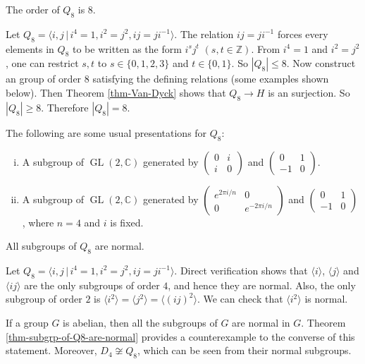 \begin{proposition}
	The order of $Q_8$ is $8$.
\end{proposition}
\begin{sketch}
	Let $Q_8 = \langle i,j\,|\, i^4=1, i^2=j^2, ij = ji^{-1}  \rangle$. The relation $ij = ji^{-1}$ forces every elements in $Q_8$ to be written as the form $i^sj^t$ $(s,t\in\mathbb{Z})$. From   $i^4=1$ and  $i^2=j^2$, one can restrict $s,t$ to  $s \in\{0,1,2,3\}$ and $t\in \{0,1\}$. So $|Q_8|\leq 8$.  Now construct an group of order $8$ satisfying the defining relations (some examples shown below). Then Theorem \ref{thm-Van-Dyck} shows that $Q_8 \to H$ is an surjection. So $|Q_8|\geq 8$.  Therefore $|Q_8|=8$.
\end{sketch}
The following are some usual presentations for $Q_8$: 
\begin{enumerate}[(i)]
	\item A subgroup of $\operatorname{GL}(2,\mathbb{C})$ generated by $\begin{pmatrix}
		0 & i\\
		i & 0
	\end{pmatrix}$ and $\begin{pmatrix}
	0 & 1\\
	-1 & 0
	\end{pmatrix}$.
	\item A subgroup of $\operatorname{GL}(2,\mathbb{C})$ generated by $\begin{pmatrix}
		e^{2\pi i/n} & 0
		\\
		0 & e^{-2\pi i/n}
	\end{pmatrix}$ and $\begin{pmatrix}
		0 & 1 \\
		-1 & 0
	\end{pmatrix}$, where $n=4$ and $i$ is fixed.
\end{enumerate}

\begin{theorem} \label{thm-subgrp-of-Q8-are-normal}
	All subgroups of $Q_8$ are normal.
\end{theorem}
\begin{sketch}
	Let $Q_8 = \langle i,j\,|\, i^4=1, i^2=j^2, ij = ji^{-1}  \rangle$. Direct verification shows that $\langle i\rangle$, $\langle j\rangle$ and $\langle ij\rangle$ are the only subgroups of order $4$, and hence they are normal. Also, the only subgroup of order $2$ is $\langle i^2 \rangle = \langle j^2 \rangle = \langle (ij)^2 \rangle$. We can check that $\langle i^2\rangle$ is normal. 
\end{sketch}
If a group $G$ is abelian, then all the subgroups of $G$ are normal in $G$. Theorem \ref{thm-subgrp-of-Q8-are-normal} provides a counterexample to the converse of this statement. Moreover, $D_4\not\cong Q_8$, which can be seen from their normal subgroups.

